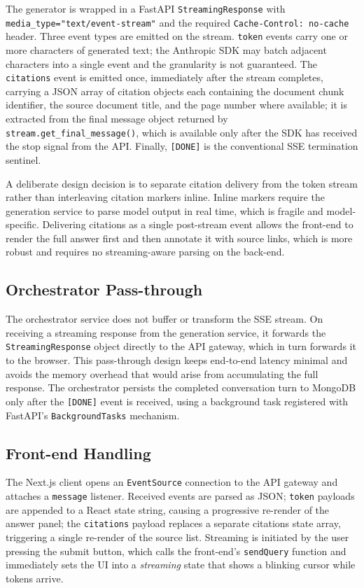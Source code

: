 The generator is wrapped in a FastAPI \texttt{StreamingResponse} with
\texttt{media\_type="text/event-stream"} and the required
\texttt{Cache-Control: no-cache} header.  Three event types are emitted on the stream.
\texttt{token} events carry one or more characters of generated text; the Anthropic SDK
may batch adjacent characters into a single event and the granularity is not guaranteed.
The \texttt{citations} event is emitted once, immediately after the stream completes,
carrying a JSON array of citation objects each containing the document chunk identifier,
the source document title, and the page number where available; it is extracted from the
final message object returned by \texttt{stream.get\_final\_message()}, which is
available only after the SDK has received the stop signal from the API.
Finally, \texttt{[DONE]} is the conventional SSE termination sentinel.

A deliberate design decision is to separate citation delivery from the token
stream rather than interleaving citation markers inline.  Inline markers
require the generation service to parse model output in real time, which is
fragile and model-specific.  Delivering citations as a single post-stream
event allows the front-end to render the full answer first and then annotate
it with source links, which is more robust and requires no streaming-aware
parsing on the back-end.

\subsection{Orchestrator Pass-through}

The orchestrator service does not buffer or transform the SSE stream.  On
receiving a streaming response from the generation service, it forwards the
\texttt{StreamingResponse} object directly to the API gateway, which in turn
forwards it to the browser.  This pass-through design keeps end-to-end latency
minimal and avoids the memory overhead that would arise from accumulating the
full response.  The orchestrator persists the completed conversation turn to
MongoDB only after the \texttt{[DONE]} event is received, using a background
task registered with FastAPI's \texttt{BackgroundTasks} mechanism.

\subsection{Front-end Handling}

The Next.js client opens an \texttt{EventSource} connection to the API gateway
and attaches a \texttt{message} listener.  Received events are parsed as JSON;
\texttt{token} payloads are appended to a React state string, causing a
progressive re-render of the answer panel; the \texttt{citations} payload
replaces a separate citations state array, triggering a single re-render of
the source list.  Streaming is initiated by the user pressing the submit
button, which calls the front-end's \texttt{sendQuery} function and
immediately sets the UI into a \emph{streaming} state that shows a blinking
cursor while tokens arrive.

